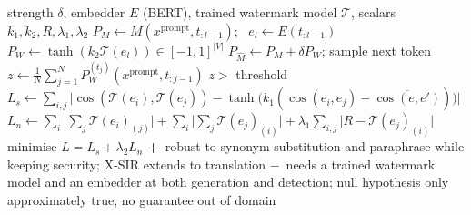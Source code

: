 \documentclass[10pt,a4paper,twocolumn]{article}
\newcommand{\pro}[1]{\Statex\textcolor{proc}{\textbf{+}\ #1}}
\newcommand{\con}[1]{\Statex\textcolor{conc}{\textbf{$-$}\ #1}}
\begin{document}
\begin{algorithm}[H]\small
\caption{SIR (Liu et al.\ 2024)}
\begin{algorithmic}[1]
\Require strength $\delta$, embedder $E$ (BERT), trained watermark model $\mathcal T$, scalars $k_1,k_2,R,\lambda_1,\lambda_2$
 \State $P_M\gets M(x^{\text{prompt}},t_{:l-1})$; \ $e_l\gets E(t_{:l-1})$
 \State $P_W\gets\tanh(k_2\mathcal T(e_l))\in[-1,1]^{|V|}$
 \State $P_{\hat M}\gets P_M+\delta P_W$; sample next token
\EndProcedure
{}
 \State $z\gets\frac1N\sum_{j=1}^NP_W^{(t_j)}(x^{\text{prompt}},t_{:j-1})$ 
 \State \Return $z>$ threshold
\EndProcedure
{}
 \State $L_s\gets\sum_{i,j}\Big|\cos(\mathcal T(e_i),\mathcal T(e_j))-\tanh\big(k_1(\cos(e_i,e_j)-\overline{\cos(e,e')})\big)\Big|$
 \State $L_n\gets\sum_i\big|\sum_j\mathcal T(e_i)_{(j)}\big|+\sum_i\big|\sum_j\mathcal T(e_j)_{(i)}\big|+\lambda_1\sum_{i,j}\big|R-\mathcal T(e_j)_{(i)}\big|$
 \State minimise $L=L_s+\lambda_2L_n$
\EndProcedure
\pro{robust to synonym substitution and paraphrase while keeping security; X-SIR extends to translation}
\con{needs a trained watermark model and an embedder at both generation and detection; null hypothesis only approximately true, no guarantee out of domain}
\end{algorithmic}
\end{algorithm}
\end{document}
